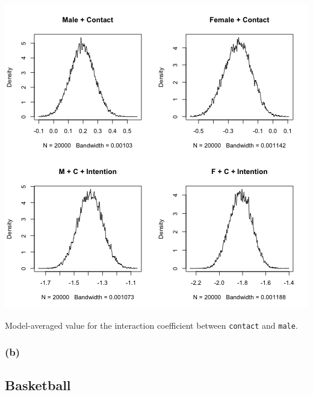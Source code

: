 \documentclass{article}
\makeatletter
\newenvironment{kframe}{%
 \def\FrameCommand##1{\hskip\@totalleftmargin \hskip-\fboxsep
 \colorbox{shadecolor}{##1}\hskip-\fboxsep
     \hskip-\linewidth \hskip-\@totalleftmargin \hskip\columnwidth}%
 \MakeFramed {\advance\hsize-\width
   \@totalleftmargin\z@ \linewidth\hsize
   \@setminipage}}%
 {\par\unskip\endMakeFramed}
\newenvironment{knitrout}{}{} %
\makeatother
\begin{document}
\begin{knitrout}
{\begin{kframe}
\centering{}\includegraphics{interact-coef} 

\end{kframe}}
\end{knitrout}

Model-averaged value for the interaction coefficient between {\tt contact} and {\tt male}. 


\subsubsection*{(b)}


\subsection*{Basketball}
\end{document}
